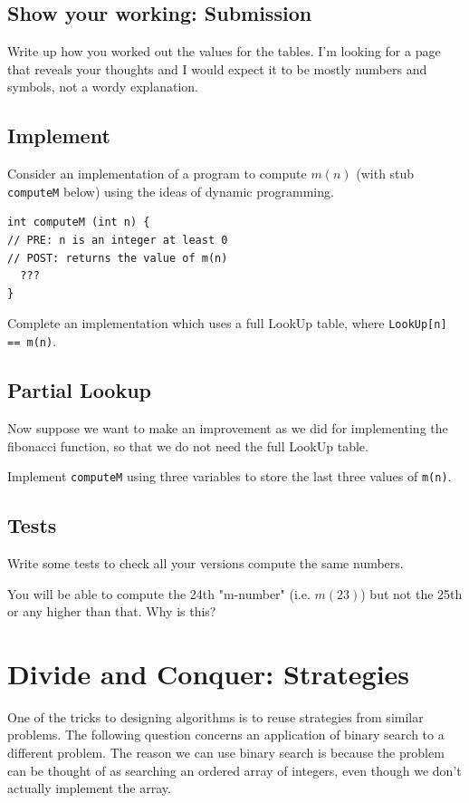 \documentclass[twoside=false,DIV=14]{scrartcl}
\begin{document}
\subsection{Show your working: Submission}
\label{sec:submission}
Write up how you worked out the values for the tables.  I'm looking for a page that reveals your thoughts and I would expect it to be mostly numbers and symbols, not a wordy explanation.

\subsection{Implement}
Consider an implementation of a program to compute $m(n)$ (with stub {\tt computeM} below) using the ideas of dynamic programming.

\begin{verbatim}
int computeM (int n) {
// PRE: n is an integer at least 0
// POST: returns the value of m(n)
  ???
}
\end{verbatim}
Complete an implementation which uses a full LookUp table, where {\tt LookUp[n] == m(n)}.

\subsection{Partial Lookup}
Now suppose we want to make an improvement as we did for implementing the fibonacci function, so that we do not need the full LookUp table.

Implement \texttt{computeM}
using three variables to store the last three values of {\tt m(n)}.

\subsection{Tests}
Write some tests to check all your versions compute the same numbers.
\begin{note}
You will be able to compute the 24th "m-number" (i.e. $m(23)$) but not the 25th or any higher than that.  Why is this?
\end{note}
\section{Divide and Conquer: Strategies}
\label{sec:binary_search}
One of the tricks to designing algorithms is to reuse strategies from similar problems. 
The following question concerns an application of binary search to a different problem. The reason we can use binary search is because the problem can be thought of as searching an ordered array of integers, even though we don't actually implement the array.
\end{document}
